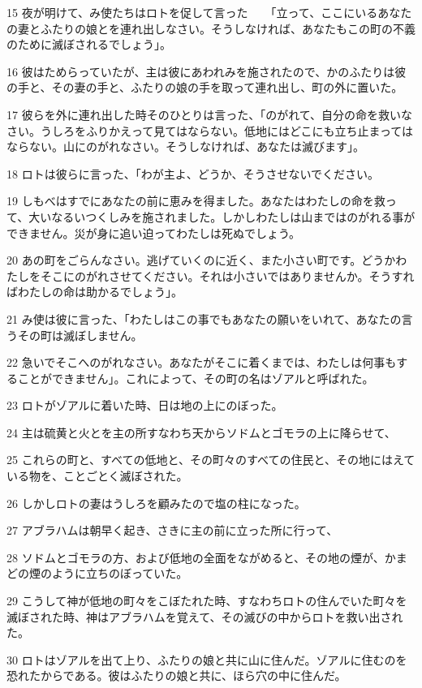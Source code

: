 \par 15 夜が明けて、み使たちはロトを促して言った　　「立って、ここにいるあなたの妻とふたりの娘とを連れ出しなさい。そうしなければ、あなたもこの町の不義のために滅ぼされるでしょう」。
\par 16 彼はためらっていたが、主は彼にあわれみを施されたので、かのふたりは彼の手と、その妻の手と、ふたりの娘の手を取って連れ出し、町の外に置いた。
\par 17 彼らを外に連れ出した時そのひとりは言った、「のがれて、自分の命を救いなさい。うしろをふりかえって見てはならない。低地にはどこにも立ち止まってはならない。山にのがれなさい。そうしなければ、あなたは滅びます」。
\par 18 ロトは彼らに言った、「わが主よ、どうか、そうさせないでください。
\par 19 しもべはすでにあなたの前に恵みを得ました。あなたはわたしの命を救って、大いなるいつくしみを施されました。しかしわたしは山まではのがれる事ができません。災が身に追い迫ってわたしは死ぬでしょう。
\par 20 あの町をごらんなさい。逃げていくのに近く、また小さい町です。どうかわたしをそこにのがれさせてください。それは小さいではありませんか。そうすればわたしの命は助かるでしょう」。
\par 21 み使は彼に言った、「わたしはこの事でもあなたの願いをいれて、あなたの言うその町は滅ぼしません。
\par 22 急いでそこへのがれなさい。あなたがそこに着くまでは、わたしは何事もすることができません」。これによって、その町の名はゾアルと呼ばれた。
\par 23 ロトがゾアルに着いた時、日は地の上にのぼった。
\par 24 主は硫黄と火とを主の所すなわち天からソドムとゴモラの上に降らせて、
\par 25 これらの町と、すべての低地と、その町々のすべての住民と、その地にはえている物を、ことごとく滅ぼされた。
\par 26 しかしロトの妻はうしろを顧みたので塩の柱になった。
\par 27 アブラハムは朝早く起き、さきに主の前に立った所に行って、
\par 28 ソドムとゴモラの方、および低地の全面をながめると、その地の煙が、かまどの煙のように立ちのぼっていた。
\par 29 こうして神が低地の町々をこぼたれた時、すなわちロトの住んでいた町々を滅ぼされた時、神はアブラハムを覚えて、その滅びの中からロトを救い出された。
\par 30 ロトはゾアルを出て上り、ふたりの娘と共に山に住んだ。ゾアルに住むのを恐れたからである。彼はふたりの娘と共に、ほら穴の中に住んだ。
